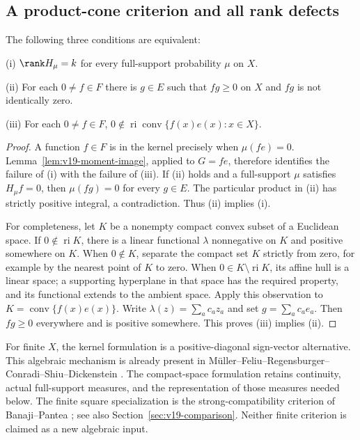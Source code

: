 \subsection{A product-cone criterion and all rank defects}
\begin{theorem}
\label{thm:v19-rectangular}
The following three conditions are equivalent:

\smallskip\noindent\textup{(i)}
$\rank H_\mu=k$ for every full-support probability $\mu$ on $X$.

\smallskip\noindent\textup{(ii)}
For each $0\ne f\in F$ there is $g\in E$ such that $fg\ge0$ on
$X$ and $fg$ is not identically zero.

\smallskip\noindent\textup{(iii)}
For each $0\ne f\in F$,
$0\notin\operatorname{ri}\operatorname{conv}\{f(x)e(x):x\in X\}$.
\end{theorem}
\begin{proof}
A function $f\in F$ is in the kernel precisely when
$\mu(f e)=0$. Lemma~\ref{lem:v19-moment-image}, applied to $G=f e$,
therefore identifies the failure of (i) with the failure of (iii).
If (ii) holds and a full-support $\mu$ satisfies $H_\mu f=0$, then
$\mu(fg)=0$ for every $g\in E$. The particular product in (ii) has
strictly positive integral, a contradiction. Thus (ii) implies (i).

For completeness, let $K$ be a nonempty compact convex subset of a
Euclidean space. If $0\notin\operatorname{ri}K$, there is a linear
functional $\lambda$ nonnegative on $K$ and positive somewhere on
$K$. When $0\notin K$, separate the compact set $K$ strictly from
zero, for example by the nearest point of $K$ to zero. When
$0\in K\setminus\operatorname{ri}K$, its affine hull is a linear
space; a supporting hyperplane in that space has the required property,
and its functional extends to the ambient space. Apply this observation
to $K=\operatorname{conv}\{f(x)e(x)\}$. Write
$\lambda(z)=\sum_a c_a z_a$ and set $g=\sum_a c_a e_a$. Then
$fg\ge0$ everywhere and is positive somewhere. This proves (iii)
implies (ii).
\end{proof}

For finite $X$, the kernel formulation is a positive-diagonal
sign-vector alternative. This algebraic mechanism is already present
in M\"uller--Feliu--Regensburger--Conradi--Shiu--Dickenstein
\cite[Lemma 2.1]{MullerEtAl2016}. The compact-space formulation retains
continuity, actual full-support measures, and the representation of
those measures needed below. The finite square specialization is the
strong-compatibility criterion of Banaji--Pantea
\cite[Definition 2.24 and Lemma 2.36]{BanajiPantea2016}; see also
Section~\ref{sec:v19-comparison}. Neither finite criterion is claimed
as a new algebraic input.


